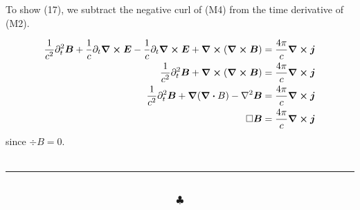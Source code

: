 \documentclass[]{article}
\begin{document}
To show (17), we subtract the negative curl of (M4) from the time derivative of (M2).

\begin{equation}
\begin{split}
\frac{1}{c^2}\partial^2_t\bm{B} + \frac{1}{c}\partial_t\curl\bm{E} - \frac{1}{c}\partial_t\curl\bm{E} + \curl(\curl\bm{B}) & = \frac{4\pi}{c}\curl\bm{j} \\
\frac{1}{c^2}\partial^2_t\bm{B} + \curl(\curl\bm{B})   & = \frac{4\pi}{c}\curl\bm{j} \\
\frac{1}{c^2}\partial^2_t\bm{B} + \grad(\div{B}) - \laplacian\bm{B}   & = \frac{4\pi}{c}\curl\bm{j} \\
\square\bm{B} & = \frac{4\pi}{c}\curl\bm{j} \\
\end{split}
\end{equation}
since $\div{B} = 0$. \\




\hfill \\
\noindent\rule{15cm}{0.4pt} \\
$$\clubsuit$$
\end{document}
